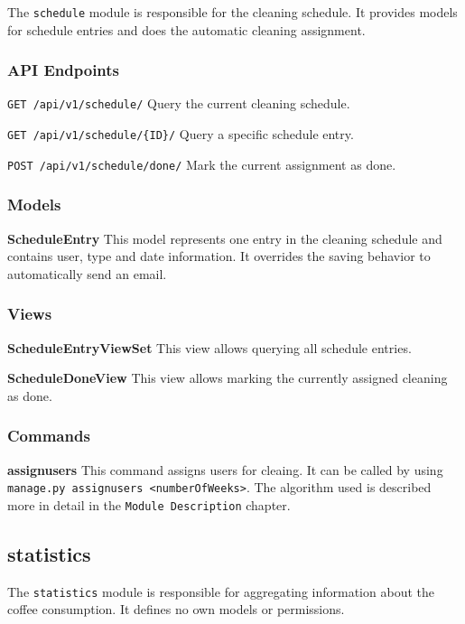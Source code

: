 The \texttt{schedule} module is responsible for the cleaning schedule.
It provides models for schedule entries and does the automatic cleaning
assignment.

\subsubsection{API Endpoints}\label{api-endpoints-1}

\texttt{GET\ /api/v1/schedule/} Query the current cleaning schedule.

\texttt{GET\ /api/v1/schedule/\{ID\}/} Query a specific schedule entry.

\texttt{POST\ /api/v1/schedule/done/} Mark the current assignment as
done.

\subsubsection{Models}\label{models-3}

\textbf{ScheduleEntry} This model represents one entry in the cleaning
schedule and contains user, type and date information. It overrides the
saving behavior to automatically send an email.

\subsubsection{Views}\label{views-3}

\textbf{ScheduleEntryViewSet} This view allows querying all schedule
entries.

\textbf{ScheduleDoneView} This view allows marking the currently
assigned cleaning as done.

\subsubsection{Commands}\label{commands}

\textbf{assignusers} This command assigns users for cleaing. It can be
called by using
\texttt{manage.py\ assignusers\ \textless{}numberOfWeeks\textgreater{}}.
The algorithm used is described more in detail in the
\texttt{Module\ Description} chapter.

\subsection{statistics}\label{statistics-1}

The \texttt{statistics} module is responsible for aggregating
information about the coffee consumption. It defines no own models or
permissions.

